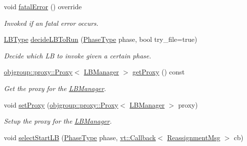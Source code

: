 \begin{DoxyCompactItemize}
void \hyperlink{structvt_1_1vrt_1_1collection_1_1balance_1_1_l_b_manager_ac13941c766e8b1b34c8591515e7942d3}{fatal\+Error} () override
\begin{DoxyCompactList}\small\item\em Invoked if an fatal error occurs. \end{DoxyCompactList}\item 
\hyperlink{namespacevt_1_1vrt_1_1collection_1_1balance_ac4f99693509affcc67db182d4aad9b5c}{L\+B\+Type} \hyperlink{structvt_1_1vrt_1_1collection_1_1balance_1_1_l_b_manager_a6c610e1c053f986932d8a59bb89eb37d}{decide\+L\+B\+To\+Run} (\hyperlink{namespacevt_a46ce6733d5cdbd735d561b7b4029f6d7}{Phase\+Type} phase, bool try\+\_\+file=true)
\begin{DoxyCompactList}\small\item\em Decide which LB to invoke given a certain phase. \end{DoxyCompactList}\item 
\hyperlink{structvt_1_1objgroup_1_1proxy_1_1_proxy}{objgroup\+::proxy\+::\+Proxy}$<$ \hyperlink{structvt_1_1vrt_1_1collection_1_1balance_1_1_l_b_manager}{L\+B\+Manager} $>$ \hyperlink{structvt_1_1vrt_1_1collection_1_1balance_1_1_l_b_manager_aa0fbba6d90873e5fa6e40767efcabb5c}{get\+Proxy} () const
\begin{DoxyCompactList}\small\item\em Get the proxy for the \hyperlink{structvt_1_1vrt_1_1collection_1_1balance_1_1_l_b_manager}{L\+B\+Manager}. \end{DoxyCompactList}\item 
void \hyperlink{structvt_1_1vrt_1_1collection_1_1balance_1_1_l_b_manager_aacef5b639acd9d984b9bcb79ecb9c6a9}{set\+Proxy} (\hyperlink{structvt_1_1objgroup_1_1proxy_1_1_proxy}{objgroup\+::proxy\+::\+Proxy}$<$ \hyperlink{structvt_1_1vrt_1_1collection_1_1balance_1_1_l_b_manager}{L\+B\+Manager} $>$ proxy)
\begin{DoxyCompactList}\small\item\em Setup the proxy for the \hyperlink{structvt_1_1vrt_1_1collection_1_1balance_1_1_l_b_manager}{L\+B\+Manager}. \end{DoxyCompactList}\item 
void \hyperlink{structvt_1_1vrt_1_1collection_1_1balance_1_1_l_b_manager_acf2b5982f927c631c4ac9bd6627105ce}{select\+Start\+LB} (\hyperlink{namespacevt_a46ce6733d5cdbd735d561b7b4029f6d7}{Phase\+Type} phase, \hyperlink{namespacevt_a36db99df4c973d48b1118a293fff533f}{vt\+::\+Callback}$<$ \hyperlink{structvt_1_1vrt_1_1collection_1_1balance_1_1_reassignment_msg}{Reassignment\+Msg} $>$ cb)

\end{DoxyCompactItemize}
